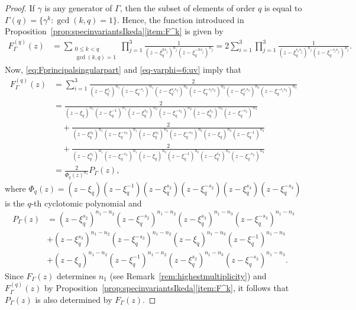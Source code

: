 \documentclass[12pt,a4paper,final]{amsart}
\theoremstyle{plain}
\theoremstyle{definition}
\theoremstyle{remark}
\numberwithin{equation}{section}
\begin{document}
\begin{proof}
If $\gamma$ is any generator of $\Gamma$, then the subset of elements of order $q$ is equal to $\Gamma(q)=\{\gamma^k: \gcd(k,q)=1\}$. 
Hence, the function introduced in Proposition~\ref{prop:specinvariantsIkeda}\eqref{item:F^k} is given by
\begin{equation}\label{eq:Fprincipalsingularpart}
\begin{aligned}
F_{\Gamma}^{(q)}(z) &
= 
\sum_{\substack{0\leq k<q \\ \gcd(k,q)=1}}
\prod_{j=1}^{3} 
	\frac{1}{(z-\xi_q^{ks_j})^{n_j} (z-\xi_q^{-ks_j})^{n_j}} 
= 
2\sum_{i=1}^{3}
\prod_{j=1}^{3} 
	\frac{1}{(z-\xi_q^{s_is_j})^{n_j} (z-\xi_q^{-s_is_j})^{n_j}} 
.
\end{aligned}
\end{equation}
Now, \eqref{eq:Fprincipalsingularpart} and \eqref{eq-varphi=6:uv} imply that 
\begin{equation}\label{eq-varphi=6:Ftilde}
\begin{aligned}
F_{\Gamma}^{(q)}(z) &
= \sum_{i=1}^{3}
\frac{2}{
	(z-\xi_q^{s_i})^{n_1} (z-\xi_q^{-s_i})^{n_1}
	(z-\xi_q^{s_is_2})^{n_2}(z-\xi_q^{-s_is_2})^{n_2}
	(z-\xi_q^{s_is_3})^{n_3}(z-\xi_q^{-s_is_3})^{n_3}
}
%
%
\\ & 
=
\frac{2}{
	(z-\xi_q)^{n_1} (z-\xi_q^{-1})^{n_1}
	(z-\xi_q^{s_2})^{n_2}(z-\xi_q^{-s_2})^{n_2}
	(z-\xi_q^{s_3})^{n_3}(z-\xi_q^{-s_3})^{n_3}
}
\\ & \quad +
\frac{2}{
	(z-\xi_q^{s_2})^{n_1} (z-\xi_q^{-s_2})^{n_1}
	(z-\xi_q^{s_3})^{n_2}(z-\xi_q^{-s_3})^{n_2}
	(z-\xi_q)^{n_3}(z-\xi_q^{-1})^{n_3}
}
\\ & \quad +
\frac{2}{
	(z-\xi_q^{s_3})^{n_1} (z-\xi_q^{-s_3})^{n_1}
	(z-\xi_q)^{n_2}(z-\xi_q^{-1})^{n_2}
	(z-\xi_q^{s_2})^{n_3}(z-\xi_q^{-s_2})^{n_3}
}
%
%
\\ & 
=
\frac{2}{\Phi_q(z)^{n_1}} P_{\Gamma}(z)
,
\end{aligned}
\end{equation}
where $\Phi_q(z)=(z-\xi_q)(z-\xi_q^{-1}) (z-\xi_q^{s_2})(z-\xi_q^{-s_2}) (z-\xi_q^{s_3})(z-\xi_q^{-s_3})$ is the $q$-th cyclotomic polynomial and 
\begin{equation}
\begin{aligned}
P_{\Gamma}(z)&
= 	(z-\xi_q^{s_2})^{n_1-n_2}(z-\xi_q^{-s_2})^{n_1-n_2}
	(z-\xi_q^{s_3})^{n_1-n_3}(z-\xi_q^{-s_3})^{n_1-n_3}
	\\& +
	(z-\xi_q^{s_3})^{n_1-n_2}(z-\xi_q^{-s_3})^{n_1-n_2}
	(z-\xi_q)^{n_1-n_3}(z-\xi_q^{-1})^{n_1-n_3}
	\\ &+ 
	(z-\xi_q)^{n_1-n_2}(z-\xi_q^{-1})^{n_1-n_2}
	(z-\xi_q^{s_2})^{n_1-n_3}(z-\xi_q^{-s_2})^{n_1-n_3}	
.
\end{aligned}
\end{equation}
Since $F_{\Gamma}(z)$ determines $n_1$ (see Remark~\ref{rem:highestmultiplicity}) and $F_{\Gamma}^{(q)}(z)$ by Proposition~\ref{prop:specinvariantsIkeda}\eqref{item:F^k}, it follows that $P_{\Gamma}(z)$ is also determined by $F_{\Gamma}(z)$. 




\end{proof}
\end{document}
